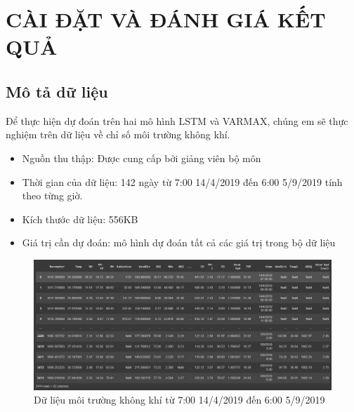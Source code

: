 \chapter{CÀI ĐẶT VÀ ĐÁNH GIÁ KẾT QUẢ}
\section{Mô tả dữ liệu}
Để thực hiện dự đoán trên hai mô hình LSTM và VARMAX, chúng em sẽ thực nghiệm trên dữ liệu về chỉ số môi trường không khí.
\begin{itemize}
    \item Nguồn thu thập: Được cung cấp bởi giảng viên bộ môn
    \item Thời gian của dữ liệu: 142 ngày từ 7:00 14/4/2019 đến 6:00 5/9/2019 tính theo từng giờ.
    \item Kích thước dữ liệu: 556KB
    \item Giá trị cần dự đoán: mô hình dự đoán tất cả các giá trị trong bộ dữ liệu
    
\end{itemize}
\begin{figure}[H]
    \centering
    \includegraphics[width=.95\textwidth]{figures/data.jpg}
    \caption[Dữ liệu môi trường không khí từ  7:00 14/4/2019 đến 6:00 5/9/2019]{Dữ liệu môi trường không khí từ  7:00 14/4/2019 đến 6:00 5/9/2019}
\end{figure}


